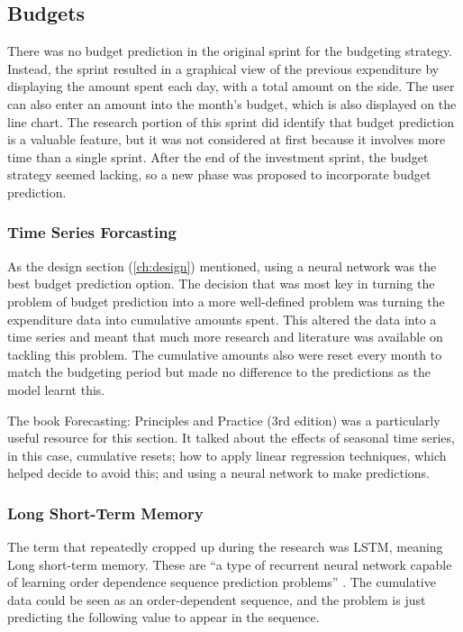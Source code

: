 \subsection{Budgets}
\label{sec:budgets}
There was no budget prediction in the original sprint for the budgeting strategy. Instead, the sprint resulted in a graphical view of the previous expenditure by displaying the amount spent each day, with a total amount on the side. The user can also enter an amount into the month's budget, which is also displayed on the line chart. The research portion of this sprint did identify that budget prediction is a valuable feature, but it was not considered at first because it involves more time than a single sprint. After the end of the investment sprint, the budget strategy seemed lacking, so a new phase was proposed to incorporate budget prediction.

\subsubsection{Time Series Forcasting}
As the design section (\ref{ch:design}) mentioned, using a neural network was the best budget prediction option. The decision that was most key in turning the problem of budget prediction into a more well-defined problem was turning the expenditure data into cumulative amounts spent. This altered the data into a time series and meant that much more research and literature was available on tackling this problem. The cumulative amounts also were reset every month to match the budgeting period but made no difference to the predictions as the model learnt this.

The book Forecasting: Principles and Practice (3rd edition) \cite{ForcastingPrinciplesPractice} was a particularly useful resource for this section. It talked about the effects of seasonal time series, in this case, cumulative resets; how to apply linear regression techniques, which helped decide to avoid this; and using a neural network to make predictions.

\subsubsection{Long Short-Term Memory}
The term that repeatedly cropped up during the research was LSTM, meaning Long short-term memory. These are ``a type of recurrent neural network capable of learning order dependence sequence prediction problems'' \cite{LSTMGentleIntro}. The cumulative data could be seen as an order-dependent sequence, and the problem is just predicting the following value to appear in the sequence.

